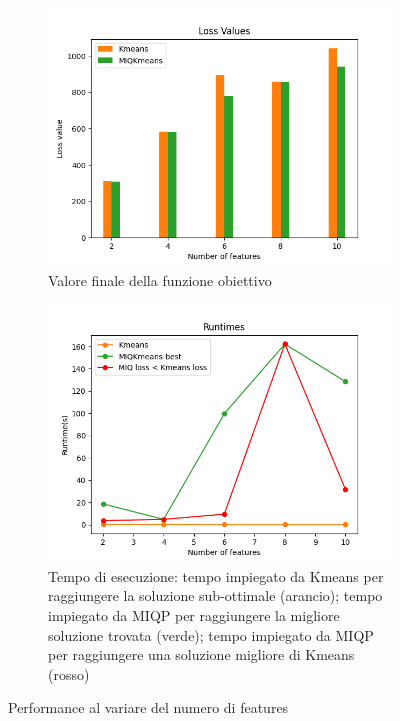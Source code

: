 \documentclass{article}
\begin{document}
    \begin{figure}[H]
     \centering
     \begin{subfigure}[t]{0.49\linewidth}
         \centering
         \includegraphics[width=\linewidth]{../results/plots/loss_features_sint}
         \caption{Valore finale della funzione obiettivo}
     \end{subfigure}
     \hfill
     \begin{subfigure}[t]{0.49\linewidth}
         \centering
         \includegraphics[width=\linewidth]{../results/plots/runtime_features_sint}
         \caption{Tempo di esecuzione: tempo impiegato da Kmeans per raggiungere la soluzione sub-ottimale (arancio); tempo impiegato da MIQP per raggiungere la migliore soluzione trovata (verde); tempo impiegato da MIQP per raggiungere una soluzione migliore di Kmeans (rosso)}
     \end{subfigure}
        \caption{Performance al variare del numero di features}
        \label{fig:f_sint}
     \end{figure}
\end{document}
